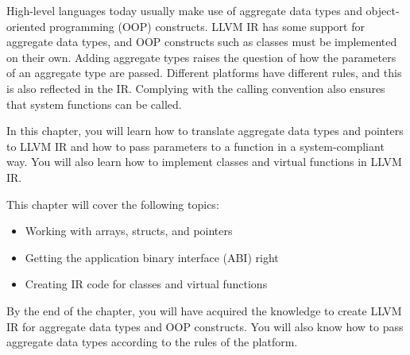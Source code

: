 
High-level languages today usually make use of aggregate data types and object-oriented programming (OOP) constructs. LLVM IR has some support for aggregate data types, and OOP constructs such as classes must be implemented on their own. Adding aggregate types raises the question of how the parameters of an aggregate type are passed. Different platforms have different rules, and this is also reflected in the IR. Complying with the calling convention also ensures that system functions can be called.

In this chapter, you will learn how to translate aggregate data types and pointers to LLVM IR and how to pass parameters to a function in a system-compliant way. You will also learn how to implement classes and virtual functions in LLVM IR.

This chapter will cover the following topics:

\begin{itemize}
\item
Working with arrays, structs, and pointers

\item
Getting the application binary interface (ABI) right

\item
Creating IR code for classes and virtual functions
\end{itemize}

By the end of the chapter, you will have acquired the knowledge to create LLVM IR for aggregate data types and OOP constructs. You will also know how to pass aggregate data types according to the rules of the platform.

































